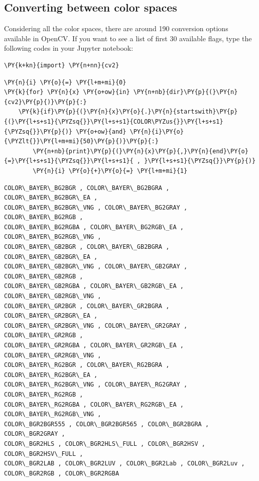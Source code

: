 \subsection{Converting between color spaces}

Considering all the color spaces, there are around 190 conversion options available in OpenCV. If you want to see a list of first 30 available flags, type the following codes in your Jupyter notebook:

\begin{tcolorbox}[breakable, size=fbox, boxrule=1pt, pad at break*=1mm,colback=cellbackground, colframe=cellborder]
	\begin{Verbatim}[commandchars=\\\{\}]
\PY{k+kn}{import} \PY{n+nn}{cv2}
	\end{Verbatim}
\end{tcolorbox}

\begin{tcolorbox}[breakable, size=fbox, boxrule=1pt, pad at break*=1mm,colback=cellbackground, colframe=cellborder]
\begin{Verbatim}[commandchars=\\\{\}]
\PY{n}{i} \PY{o}{=} \PY{l+m+mi}{0}
\PY{k}{for} \PY{n}{x} \PY{o+ow}{in} \PY{n+nb}{dir}\PY{p}{(}\PY{n}{cv2}\PY{p}{)}\PY{p}{:}
    \PY{k}{if}\PY{p}{(}\PY{n}{x}\PY{o}{.}\PY{n}{startswith}\PY{p}{(}\PY{l+s+s1}{\PYZsq{}}\PY{l+s+s1}{COLOR\PYZus{}}\PY{l+s+s1}{\PYZsq{}}\PY{p}{)} \PY{o+ow}{and} \PY{n}{i}\PY{o}{\PYZlt{}}\PY{l+m+mi}{50}\PY{p}{)}\PY{p}{:}
        \PY{n+nb}{print}\PY{p}{(}\PY{n}{x}\PY{p}{,}\PY{n}{end}\PY{o}{=}\PY{l+s+s1}{\PYZsq{}}\PY{l+s+s1}{ , }\PY{l+s+s1}{\PYZsq{}}\PY{p}{)}
        \PY{n}{i} \PY{o}{+}\PY{o}{=} \PY{l+m+mi}{1}
\end{Verbatim}
\end{tcolorbox}

\begin{Verbatim}[commandchars=\\\{\}]
COLOR\_BAYER\_BG2BGR , COLOR\_BAYER\_BG2BGRA , COLOR\_BAYER\_BG2BGR\_EA ,
COLOR\_BAYER\_BG2BGR\_VNG , COLOR\_BAYER\_BG2GRAY , COLOR\_BAYER\_BG2RGB ,
COLOR\_BAYER\_BG2RGBA , COLOR\_BAYER\_BG2RGB\_EA , COLOR\_BAYER\_BG2RGB\_VNG ,
COLOR\_BAYER\_GB2BGR , COLOR\_BAYER\_GB2BGRA , COLOR\_BAYER\_GB2BGR\_EA ,
COLOR\_BAYER\_GB2BGR\_VNG , COLOR\_BAYER\_GB2GRAY , COLOR\_BAYER\_GB2RGB ,
COLOR\_BAYER\_GB2RGBA , COLOR\_BAYER\_GB2RGB\_EA , COLOR\_BAYER\_GB2RGB\_VNG ,
COLOR\_BAYER\_GR2BGR , COLOR\_BAYER\_GR2BGRA , COLOR\_BAYER\_GR2BGR\_EA ,
COLOR\_BAYER\_GR2BGR\_VNG , COLOR\_BAYER\_GR2GRAY , COLOR\_BAYER\_GR2RGB ,
COLOR\_BAYER\_GR2RGBA , COLOR\_BAYER\_GR2RGB\_EA , COLOR\_BAYER\_GR2RGB\_VNG ,
COLOR\_BAYER\_RG2BGR , COLOR\_BAYER\_RG2BGRA , COLOR\_BAYER\_RG2BGR\_EA ,
COLOR\_BAYER\_RG2BGR\_VNG , COLOR\_BAYER\_RG2GRAY , COLOR\_BAYER\_RG2RGB ,
COLOR\_BAYER\_RG2RGBA , COLOR\_BAYER\_RG2RGB\_EA , COLOR\_BAYER\_RG2RGB\_VNG ,
COLOR\_BGR2BGR555 , COLOR\_BGR2BGR565 , COLOR\_BGR2BGRA , COLOR\_BGR2GRAY ,
COLOR\_BGR2HLS , COLOR\_BGR2HLS\_FULL , COLOR\_BGR2HSV , COLOR\_BGR2HSV\_FULL ,
COLOR\_BGR2LAB , COLOR\_BGR2LUV , COLOR\_BGR2Lab , COLOR\_BGR2Luv ,
COLOR\_BGR2RGB , COLOR\_BGR2RGBA 
\end{Verbatim}

